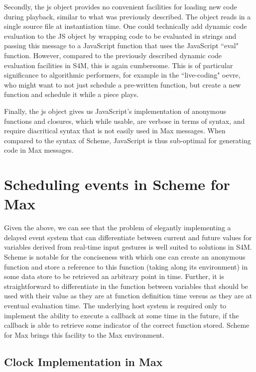 \documentclass[acmsmall]{acmart}
\begin{document}
Secondly, the js object provides no convenient facilities for loading new code
during playback, similar to what was previously described. 
The object reads in a single source file at instantiation time.
One could technically add dynamic code evaluation to the JS object by wrapping
code to be evaluated in strings and passing this message to a JavaScript function
that uses the JavaScript ``eval" function. However, compared to the previously 
described dynamic code evaluation facilities in S4M, this is again cumbersome. 
This is of particular significance to algorithmic performers, 
for example in the ``live-coding" oevre, who might
want to not just schedule a pre-written function, but create a new function 
and schedule it while a piece plays.

Finally, the js object gives us JavaScript's implementation of anonymous functions
and closures, which while usable, are verbose in terms of syntax, and require
diacritical syntax that is not easily used in Max messages. When compared to the syntax
of Scheme, JavaScript is thus sub-optimal for generating code in Max messages.


\section{Scheduling events in Scheme for Max}

Given the above, we can see that the problem of elegantly implementing 
a delayed event system that can differentiate between current and future values
for variables derived from real-time input gestures is well suited to solutions 
in S4M. Scheme is notable for the conciseness with which one can create an anonymous function
and store a reference to this function (taking along its environment) in some data
store to be retrieved an arbitrary point in time. Further, it is straightforward
to differentiate in the function between variables that should
be used with their value as they are at function definition time versus
as they are at eventual evaluation time. The underlying host system is required only to 
implement the ability to execute a callback at some time in the future, if 
the callback is able to retrieve some indicator of the correct function stored.
Scheme for Max brings this facility to the Max environment.


\subsection{Clock Implementation in Max}
\end{document}
